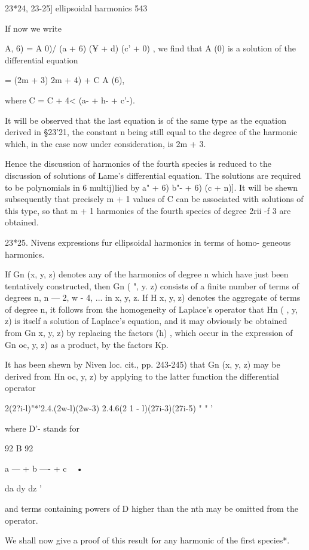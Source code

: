 {23*24, 23-25] ellipsoidal harmonics 543

If now we write

A, 6) = A 0)/ (a + 6) (¥ + d) (c' + 0) , we find that A (0) is a
solution of the differential equation

= (2m + 3) 2m + 4) + C A (6),

where C = C + 4< (a- + h- + c'-).

It will be observed that the last equation is of the same type as the
equation derived in §23'21, the constant n being still equal to the
degree of the harmonic which, in the case now under consideration, is
2m + 3.

Hence the discussion of harmonics of the fourth species is reduced to
the discussion of solutions of Lame's differential equation. The
solutions are required to be polynomials in 6 multij)lied by \/ a" +
6) b"- + 6) (c + n)]. It will be shewn subsequently that precisely m +
1 values of C can be associated with solutions of this type, so that m
+ 1 harmonics of the fourth species of degree 2rii -f 3 are obtained.

23*25. Nivens expressions fur ellipsoidal harmonics in terms of homo-
geneous harmonics.

If Gn (x, y, z) denotes any of the harmonics of degree n which have
just been tentatively constructed, then Gn ( ", y. z) consists of a
finite number of terms of degrees n, n — 2, w - 4, ... in x, y, z. If
H x, y, z) denotes the aggregate of terms of degree n, it follows from
the homogeneity of Laplace's operator that Hn ( , y, z) is itself a
solution of Laplace's equation, and it may obviously be obtained from
Gn x, y, z) by replacing the factors (h) , which occur in the
expression of Gn oc, y, z) as a product, by the factors Kp.

It has been shewn by Niven loc. cit., pp. 243-245) that Gn (x, y, z)
may be derived from Hn oc, y, z) by applying to the latter function
the differential operator

2(2?i-l)"*'2.4.(2w-l)(2w-3) 2.4.6(2 1 - l)(27i-3)(27i-5) " " '

where D'- stands for

92 B 92

a — + b —- + c ~ •

da dy dz '

and terms containing powers of D higher than the nth may be omitted
from the operator.

We shall now give a proof of this result for any harmonic of the first
species*.

}
